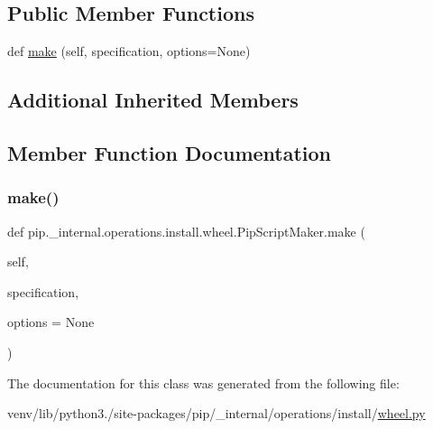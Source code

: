 \subsection*{Public Member Functions}
\begin{DoxyCompactItemize}
\item 
def \hyperlink{classpip_1_1__internal_1_1operations_1_1install_1_1wheel_1_1PipScriptMaker_afe5796f33a6af1ceb0d92a10d1ef54e0}{make} (self, specification, options=None)
\end{DoxyCompactItemize}
\subsection*{Additional Inherited Members}


\subsection{Member Function Documentation}
\mbox{\label{classpip_1_1__internal_1_1operations_1_1install_1_1wheel_1_1PipScriptMaker_afe5796f33a6af1ceb0d92a10d1ef54e0}} 
\subsubsection{\texorpdfstring{make()}{make()}}
{\footnotesize\ttfamily def pip.\+\_\+internal.\+operations.\+install.\+wheel.\+Pip\+Script\+Maker.\+make (\begin{DoxyParamCaption}\item[{}]{self,  }\item[{}]{specification,  }\item[{}]{options = {\ttfamily None} }\end{DoxyParamCaption})}



The documentation for this class was generated from the following file\+:\begin{DoxyCompactItemize}
\item 
venv/lib/python3./site-\/packages/pip/\+\_\+internal/operations/install/\hyperlink{pip_2__internal_2operations_2install_2wheel_8py}{wheel.\+py}\end{DoxyCompactItemize}
